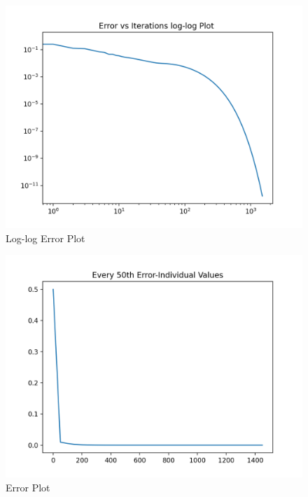 \documentclass[12pt, a4paper]{report}
\begin{document}
 \begin{figure}[!tbh]
   	\centering
   	\includegraphics[scale=0.75]{Q2b.png}
   	\caption{Log-log Error Plot}
   	\label{fig:allgraphs}
 \end{figure} 
 \begin{figure}[!tbh]
   	\centering
   	\includegraphics[scale=0.75]{Q2c.png}
   	\caption{Error Plot}
   	\label{fig:allgraphs}
 \end{figure} 
 
\end{document}
